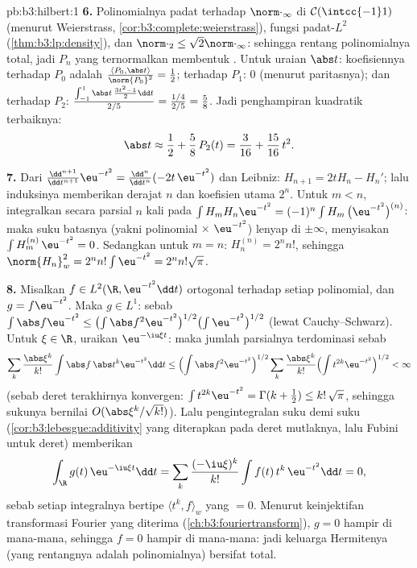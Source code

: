\begin{solution}{pb:b3:hilbert:1}
\textbf{6.} Polinomialnya padat terhadap $\norm\cdot_\infty$ di
$\mathcal C(\intcc{-1}1)$ (menurut Weierstrass,
\cref{cor:b3:complete:weierstrass}), fungsi 
padat-$L^2$ (\cref{thm:b3:lp:density}), dan
$\norm\cdot_2 \leq \sqrt2\norm\cdot_\infty$: sehingga rentang polinomialnya
total, jadi $P_n$ yang ternormalkan membentuk .
Untuk uraian $\abs t$: koefisiennya terhadap $P_0$ adalah
$\frac{\langle P_0, \abs t\rangle}{\norm{P_0}^2} = \frac12$;
terhadap $P_1$: $0$ (menurut paritasnya); dan terhadap $P_2$:
$\frac{\int_{-1}^1\abs t\,\frac{3t^2-1}2\dd t}{2/5} =
\frac{1/4}{2/5} = \frac58$. Jadi penghampiran kuadratik terbaiknya:
\[
\abs t \approx \frac12 + \frac58\,P_2(t) = \frac{3}{16} +
\frac{15}{16}\,t^2 .
\]

\textbf{7.} Dari $\frac{\dd^{n+1}}{\dd t^{n+1}}\eu^{-t^2} =
\frac{\dd^n}{\dd t^n}(-2t\,\eu^{-t^2})$ dan Leibniz: $H_{n+1}
= 2tH_n - H_n'$; lalu induksinya memberikan derajat $n$ dan koefisien
utama $2^n$. Untuk $m < n$, integralkan secara parsial $n$ kali
pada $\int H_m H_n\eu^{-t^2} = (-1)^n\int H_m\,\bigl(\eu^{-t^2}
\bigr)^{(n)}$: maka suku batasnya (yakni polinomial $\times$
$\eu^{-t^2}$) lenyap di $\pm\infty$, menyisakan $\int
H_m^{(n)}\,\eu^{-t^2} = 0$. Sedangkan untuk $m = n$: $H_n^{(n)} = 2^nn!$,
sehingga $\norm{H_n}_w^2 = 2^nn!\int\eu^{-t^2} = 2^nn!\sqrt\pi$.

\textbf{8.} Misalkan $f \in L^2(\R, \eu^{-t^2}\dd t)$ ortogonal
terhadap setiap polinomial, dan $g = f\eu^{-t^2}$. Maka $g \in
L^1$: sebab $\int\abs f\eu^{-t^2} \leq \bigl(\int\abs
f^2\eu^{-t^2}\bigr)^{1/2}\bigl(\int\eu^{-t^2}\bigr)^{1/2}$
(lewat Cauchy--Schwarz). Untuk $\xi \in \R$, uraikan $\eu^{-\iu\xi t}$:
maka jumlah parsialnya terdominasi sebab
\[
\sum_k\frac{\abs\xi^k}{k!}\int\abs f\,\abs t^k\eu^{-t^2}\dd t
\leq \Bigl(\int \abs f^2\eu^{-t^2}\Bigr)^{1/2}
\sum_k\frac{\abs\xi^k}{k!}\Bigl(\int
t^{2k}\eu^{-t^2}\Bigr)^{1/2} < \infty
\]
(sebab deret terakhirnya konvergen: $\int t^{2k}\eu^{-t^2} =
\Gamma(k+\frac12) \leq k!\,\sqrt\pi$, sehingga sukunya bernilai
$O(\abs\xi^k/\sqrt{k!})$). Lalu pengintegralan suku demi suku
(\cref{cor:b3:lebesgue:additivity} yang diterapkan pada deret
mutlaknya, lalu Fubini untuk deret) memberikan
\[
\int_\R g(t)\,\eu^{-\iu\xi t}\dd t
= \sum_k\frac{(-\iu\xi)^k}{k!}\int f(t)\,t^k\,\eu^{-t^2}\dd t
= 0 ,
\]
sebab setiap integralnya bertipe $\langle t^k, f\rangle_w$ yang $= 0$. Menurut
keinjektifan transformasi Fourier yang diterima
(\cref{ch:b3:fouriertransform}), $g = 0$ hampir di mana-mana, sehingga $f = 0$
hampir di mana-mana: jadi keluarga Hermitenya (yang rentangnya adalah polinomialnya) bersifat
total.


\end{solution}
